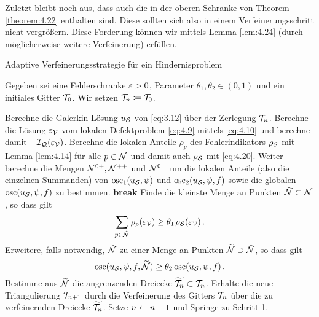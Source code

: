 Zuletzt bleibt noch aus, dass auch die  in der oberen Schranke von Theorem \ref{theorem:4.22} enthalten sind. Diese sollten sich also in einem Verfeinerungsschritt nicht vergrößern. Diese Forderung können wir mittels Lemma \ref{lem:4.24} (durch möglicherweise weitere Verfeinerung) erfüllen.



\begin{algorithm}[H]
\caption{Adaptive Verfeinerungsstrategie für ein Hindernisproblem\label{alg:4.1}}
Gegeben sei eine Fehlerschranke $\varepsilon>0$, Parameter $\theta_1,\theta_2 \in (0,1)$ und ein initiales Gitter $\mathcal T_0$. Wir setzen $\mathcal T_n \coloneqq \mathcal T_0$.
\begin{algorithmic}[1] 
\State Berechne die Galerkin-Lösung $u_{\mathcal S}$ von \eqref{eq:3.12} über der Zerlegung $\mathcal T_n$.
\State Berechne die Lösung $\varepsilon_{\mathcal V}$ vom lokalen Defektproblem \eqref{eq:4.9} mittels \eqref{eq:4.10} und berechne damit $-\mathcal I_{\mathcal Q}(\varepsilon_{\mathcal V})$.
\State Berechne die lokalen Anteile $\rho_p$ des Fehlerindikators $\rho_{\mathcal S}$ mit Lemma \ref{lem:4.14} für alle $p \in \mathcal N$ und damit auch $\rho_{\mathcal S}$ mit \eqref{eq:4.20}. 
\State Weiter berechne die Mengen $\mathcal N^{0+},\mathcal N^{++}$ und $\mathcal N^{0-}$ um die lokalen Anteile (also die einzelnen Summanden) von $\operatorname{osc}_1(u_{\mathcal S},\psi)$ und $\operatorname{osc}_2(u_{\mathcal S},\psi,f)$ sowie die globalen  $\operatorname{osc} (u_{\mathcal S},\psi,f)$ zu bestimmen.
\State \textbf{break} 
\EndIf 
\State Finde die kleinste Menge an Punkten $\hat{\mathcal N}\subset \mathcal N$, so dass gilt
\[
	\sum_{p \in \hat{\mathcal N}} \rho_p (\varepsilon_{\mathcal V}) \ge \theta_1\;\! \rho_{\mathcal S}(\varepsilon_{\mathcal V}) \,.
\]
\State Erweitere, falls notwendig, $\hat{\mathcal N}$ zu einer Menge an Punkten $\widetilde{\mathcal N} \supset \hat{\mathcal N}$, so dass gilt
\[
	\operatorname{osc} (u_{\mathcal S},\psi,f,\widetilde{\mathcal N}) \ge \theta_2 \operatorname{osc} (u_{\mathcal S},\psi,f) \, .
\]
\State Bestimme aus $\widetilde{\mathcal N}$ die angrenzenden Dreiecke $\widetilde{\mathcal T_n} \subset \mathcal T_n$. 
\State Erhalte die neue Triangulierung $\mathcal T_{n+1}$ durch die Verfeinerung des Gitters $\mathcal T_n$ über die zu verfeinernden Dreiecke $\widetilde{\mathcal T_n}$.
\State Setze $n \leftarrow n+1$ und Springe zu Schritt 1.
\end{algorithmic}
\end{algorithm}





